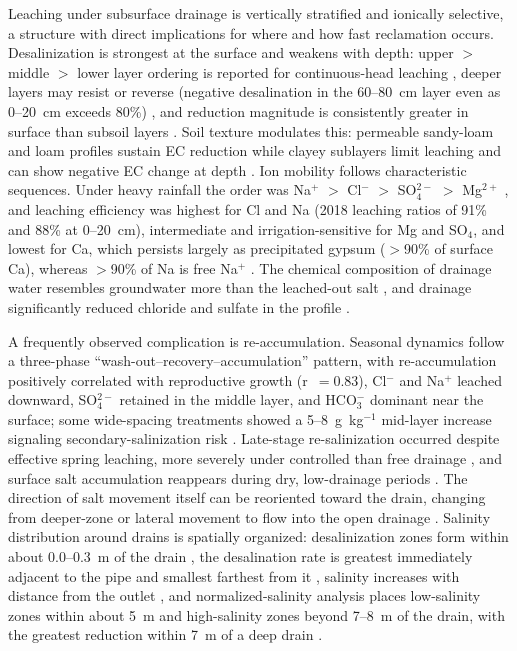 Leaching under subsurface drainage is vertically stratified and ionically selective, a structure with direct implications for where and how fast reclamation occurs. Desalinization is strongest at the surface and weakens with depth: upper $>$ middle $>$ lower layer ordering is reported for continuous-head leaching \parencite{Chen2022}, deeper layers may resist or reverse (negative desalination in the 60--80~cm layer even as 0--20~cm exceeds 80\%) \parencite{Han2023}, and reduction magnitude is consistently greater in surface than subsoil layers \parencite{Narjary2024,Tian2024}. Soil texture modulates this: permeable sandy-loam and loam profiles sustain EC reduction while clayey sublayers limit leaching and can show negative EC change at depth \parencite{Qin2025}. Ion mobility follows characteristic sequences. Under heavy rainfall the order was Na$^+$ $>$ Cl$^-$ $>$ SO$_4^{2-}$ $>$ Mg$^{2+}$ \parencite{Yu2016}, and leaching efficiency was highest for Cl and Na (2018 leaching ratios of 91\% and 88\% at 0--20~cm), intermediate and irrigation-sensitive for Mg and SO$_4$, and lowest for Ca, which persists largely as precipitated gypsum ($>$90\% of surface Ca), whereas $>$90\% of Na is free Na$^+$ \parencite{Qian2025}. The chemical composition of drainage water resembles groundwater more than the leached-out salt \parencite{Qian2025}, and drainage significantly reduced chloride and sulfate in the profile \parencite{Sharma2000}.

A frequently observed complication is re-accumulation. Seasonal dynamics follow a three-phase ``wash-out--recovery--accumulation'' pattern, with re-accumulation positively correlated with reproductive growth (r~$=0.83$), Cl$^-$ and Na$^+$ leached downward, SO$_4^{2-}$ retained in the middle layer, and HCO$_3^-$ dominant near the surface; some wide-spacing treatments showed a 5--8~g~kg$^{-1}$ mid-layer increase signaling secondary-salinization risk \parencite{Zhu2025b}. Late-stage re-salinization occurred despite effective spring leaching, more severely under controlled than free drainage \parencite{Dou2022}, and surface salt accumulation reappears during dry, low-drainage periods \parencite{Yu2016,Shi2021b}. The direction of salt movement itself can be reoriented toward the drain, changing from deeper-zone or lateral movement to flow into the open drainage \parencite{Okuda2020}. Salinity distribution around drains is spatially organized: desalinization zones form within about 0.0--0.3~m of the drain \parencite{Lu2019}, the desalination rate is greatest immediately adjacent to the pipe and smallest farthest from it \parencite{Heng2021}, salinity increases with distance from the outlet \parencite{Han2023}, and normalized-salinity analysis places low-salinity zones within about 5~m and high-salinity zones beyond 7--8~m of the drain, with the greatest reduction within 7~m of a deep drain \parencite{Mirlas2003,Benyamini2005}.


